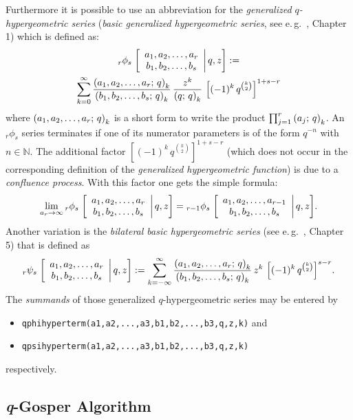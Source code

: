 Furthermore it is possible to use an abbreviation for the
\textsl{generalized $q$-hypergeometric series}
(\textsl{basic generalized hypergeometric series},
see e.\,g.\ \cite{GasperRahman:90}, Chapter 1) which is defined as:
\begin{multline}
	{}_{r}\phi_{s}\left.\left[\begin{array}{c} a_1,a_2,\ldots,a_r \\ b_1,b_2,\ldots,b_s \end{array}\right|q,z\right]:=\\
	\sum_{k=0}^{\infty}{\frac{\left(a_1,a_2,\ldots,a_r;\,q\right)_{k}}
	{\left(b_1,b_2,\ldots,b_s;\,q\right)_{k}}
	\,\frac{z^k}{\left(q;\,q\right)_{k}}\,\left[(-1)^k\,
	q^{\binom{k}{2}}\right]^{1+s-r}}
\end{multline}
where $\left(a_1,a_2,\ldots,a_r;\,q\right)_{k}$ is a short form to write the
product $\prod_{j=1}^r{\left(a_j;\,q\right)_{k}}$. An ${}_r\phi_s$ series
terminates if one of its numerator parameters is of the form
$q^{-n}$ with $n\in\mathbb{N}$. The additional factor
$\left[(-1)^k\,q^{\binom{k}{2}}\right]^{1+s-r}$ (which does not
occur in the corresponding definition of the \textsl{generalized
hypergeometric function}) is due to a \textsl{confluence process}.
With this factor one gets the simple formula:
\[
	\lim_{a_r\rightarrow\infty}{{}_{r}\phi_{s}\left.\left[\begin{array}{c} a_1,a_2,\ldots,a_r \\ b_1,b_2,\ldots,b_s \end{array}\right|q,z\right]} =
	{{}_{r-1}\phi_{s}\left.\left[\begin{array}{c} a_1,a_2,\ldots,a_{r-1} \\ b_1,b_2,\ldots,b_s \end{array}\right|q,z\right]}.
\]
Another variation is the \textsl{bilateral basic hypergeometric
series} (see e.\,g.\ \cite{GasperRahman:90}, Chapter 5) that is defined as
\[
	{}_{r}\psi_{s}\left.\left[\begin{array}{c} a_1,a_2,\ldots,a_r \\ b_1,b_2,\ldots,b_s \end{array}\right|q,z\right]:=
	\sum_{k=-\infty}^{\infty}{\frac{\left(a_1,a_2,\ldots,a_r;\,q\right)_{k}}
	{\left(b_1,b_2,\ldots,b_s;\,q\right)_{k}}\,z^k\,
	\left[(-1)^k\,q^{\binom{k}{2}}\right]^{s-r}}.
\]
The \textsl{summands} of those generalized $q$-hypergeometric series may
be entered by
\begin{itemize}
	\item \texttt{qphihyperterm({a1,a2,...,a3},{b1,b2,...,b3},q,z,k)}
		and
	\item \texttt{qpsihyperterm({a1,a2,...,a3},{b1,b2,...,b3},q,z,k)}
\end{itemize}
respectively.


\subsection{\textsl{q}-Gosper Algorithm}
\label{qgosper}

